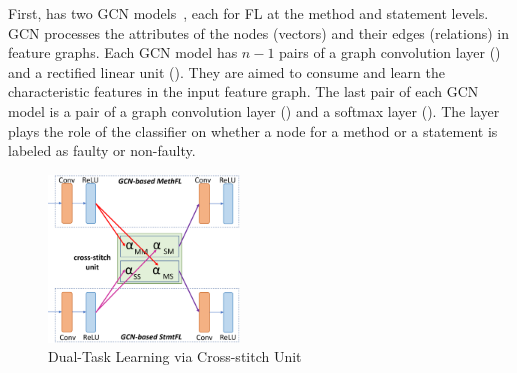 





 First, {\tool}
has two GCN models~\cite{kipf2016semi}, each for FL at the method and
statement levels. GCN processes the attributes of the nodes (vectors)
and their edges (relations) in feature graphs. Each GCN model has
$n-1$ pairs of a graph convolution layer () and a rectified
linear unit (). They are aimed to consume and learn the
characteristic features in the input feature graph. The last pair of
each GCN model is a pair of a graph convolution layer ()
and a softmax layer (). The  layer plays
the role of the classifier on whether a node for a method or a
statement is labeled as faulty or non-faulty.



\begin{figure}[t]
	\centering
	\includegraphics[width=2in]{graphs/cross-stitch.png}
        \vspace{-6pt}
	\caption{Dual-Task Learning via Cross-stitch Unit}
	\label{cross-stitch}
\end{figure}

